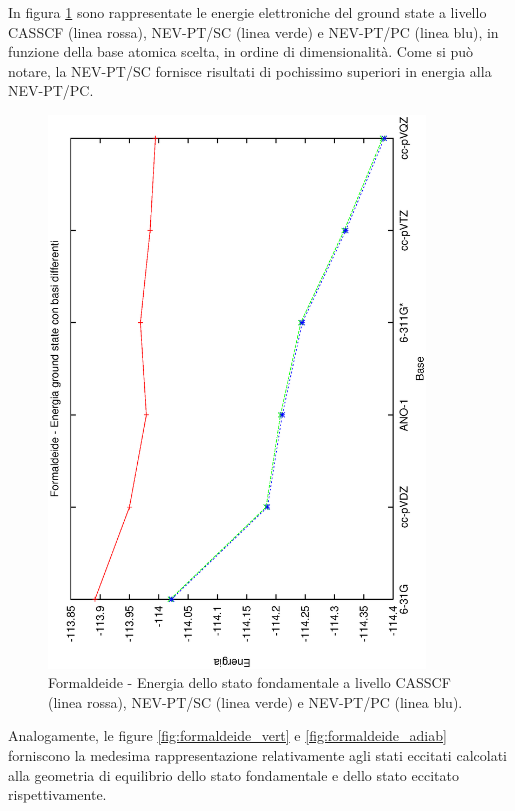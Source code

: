In figura \ref{fig:formaldeide_gs} sono rappresentate le energie elettroniche del
ground state a livello CASSCF (linea rossa), NEV-PT/SC (linea verde) e
NEV-PT/PC (linea blu), in funzione della base atomica scelta, in ordine di
dimensionalit\`a. Come si pu\`o notare, la NEV-PT/SC fornisce
risultati di pochissimo superiori in energia alla NEV-PT/PC.

\begin{figure}[ht]
\begin{center}
\includegraphics[angle=270,width=10cm,keepaspectratio]{immagini/formaldeide/gs.eps}
\parbox[h]{10cm}{
\caption{\small Formaldeide - Energia dello stato fondamentale a livello CASSCF (linea rossa),
NEV-PT/SC (linea verde) e NEV-PT/PC (linea blu). }
\label{fig:formaldeide_gs}
}
\end{center}
\end{figure}
\clearpage

Analogamente, le figure \ref{fig:formaldeide_vert} e
\ref{fig:formaldeide_adiab} forniscono la medesima rappresentazione
relativamente agli stati eccitati calcolati alla geometria di equilibrio
dello stato fondamentale e dello stato eccitato rispettivamente. 

